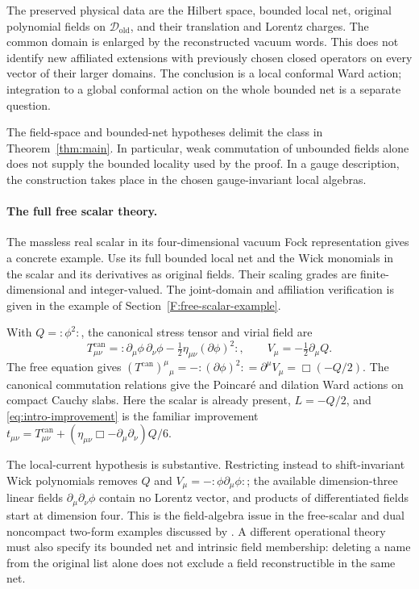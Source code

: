 The preserved physical data are the Hilbert space, bounded local net,
original polynomial fields on $\mathcal D_{\mathrm{old}}$, and their
translation and Lorentz charges. The common domain is enlarged by the
reconstructed vacuum words. This does not identify new affiliated
extensions with previously chosen closed operators on every vector of
their larger domains. The conclusion is a local conformal Ward action;
integration to a global conformal action on the whole bounded net is a
separate question.

The field-space and bounded-net hypotheses delimit the class in
Theorem~\ref{thm:main}. In particular, weak commutation of unbounded
fields alone does not supply the bounded locality used by the proof.
In a gauge description, the construction takes place in the chosen
gauge-invariant local algebras.

\paragraph{The full free scalar theory.}
The massless real scalar in its four-dimensional vacuum Fock
representation gives a concrete example. Use its full bounded local
net and the Wick monomials in the scalar and its derivatives as
original fields. Their scaling grades are finite-dimensional and
integer-valued. The joint-domain and affiliation verification is given
in the example of Section~\ref{F:free-scalar-example}.

With $Q=:\!\phi^2\!:$, the canonical stress tensor and virial field are
\[
 T^{\mathrm{can}}_{\mu\nu}
 =:\!\partial_\mu\phi\,\partial_\nu\phi
       -\tfrac12\eta_{\mu\nu}(\partial\phi)^2\!:,
 \qquad V_\mu=-\tfrac12\partial_\mu Q .
\]
The free equation gives
$(T^{\mathrm{can}})^\mu{}_\mu
=-:\!(\partial\phi)^2\!:
=\partial^\mu V_\mu=\Box(-Q/2)$.
The canonical commutation relations give the Poincar\'e and dilation
Ward actions on compact Cauchy slabs. Here the scalar is already
present, $L=-Q/2$, and \eqref{eq:intro-improvement} is the familiar
improvement
$t_{\mu\nu}=T^{\mathrm{can}}_{\mu\nu}
+(\eta_{\mu\nu}\Box-\partial_\mu\partial_\nu)Q/6$.

The local-current hypothesis is substantive. Restricting instead to
shift-invariant Wick polynomials removes $Q$ and
$V_\mu=-:\!\phi\partial_\mu\phi\!:$; the available dimension-three
linear fields $\partial_\mu\partial_\nu\phi$ contain no Lorentz
vector, and products of differentiated fields start at dimension
four. This is the field-algebra issue in the free-scalar and dual
noncompact two-form examples discussed by
\citet{DymarskyZhiboedov2015,Nakayama2015}. A different operational
theory must also specify its bounded net and intrinsic field
membership: deleting a name from the original list alone does not
exclude a field reconstructible in the same net.

